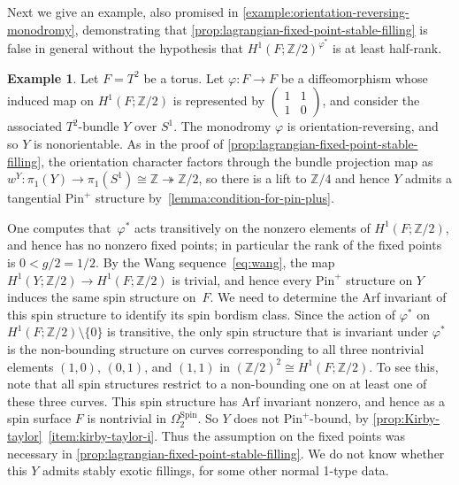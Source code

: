 \documentclass[a4paper, reqno]{amsart}
\theoremstyle{definition}
\newtheorem{example}[proposition]{Example}
\theoremstyle{remark}
\newcommand{\Z}{\mathbb{Z}}
\newcommand{\pinplus}{{\mathrm{Pin}^+}\!}
\newcommand{\Spin}{\mathrm{Spin}}
\newcommand{\sm}{\setminus}
\begin{document}
Next  we  give an example, also promised in \cref{example:orientation-reversing-monodromy}, demonstrating that   \cref{prop:lagrangian-fixed-point-stable-filling} is false in general without the hypothesis that $H^1(F;\Z/2)^{\varphi^*}$ is at least half-rank. 

\begin{example}\label{example:need-lagrangian-assumption}
 Let $F=T^2$ be a torus. Let $\varphi \colon F \to F$ be a diffeomorphism whose induced map on $H^1(F;\Z/2)$ is represented by $\left(\begin{smallmatrix}
     1 & 1 \\ 1 & 0 
 \end{smallmatrix} \right)$, and consider the associated $T^2$-bundle $Y$ over $S^1$.  
 The monodromy $\varphi$ is orientation-reversing, and so $Y$ is nonorientable.
As in the proof of \cref{prop:lagrangian-fixed-point-stable-filling}, the orientation character factors through the bundle projection map as
    $w^Y \colon \pi_1(Y) \to \pi_1(S^1) \cong \Z \twoheadrightarrow \Z/2$, so there is a lift to $\Z/4$ and hence $Y$ admits a tangential $\pinplus$ structure by~\cref{lemma:condition-for-pin-plus}. 
 
 One computes that~$\varphi^*$ acts transitively on the nonzero elements of $H^1(F;\Z/2)$, and hence has no nonzero fixed points; in particular the rank of the fixed points is $0 < g/2 = 1/2$. By the Wang sequence~\eqref{eq:wang}, the map $H^1(Y;\Z/2) \to H^1(F;\Z/2)$ is trivial, and hence every $\pinplus$ structure on $Y$ induces the same spin structure on~$F$. We need to determine the Arf invariant of this spin structure to identify its spin bordism class.  
 Since the action of $\varphi^*$ on  $H^1(F;\Z/2) \sm \{0\}$ is transitive, the only spin structure that is invariant under $\varphi^*$ is the non-bounding structure on curves corresponding to all three nontrivial elements $(1,0)$, $(0,1)$, and $(1,1)$ in $(\Z/2)^2 \cong H^1(F;\Z/2)$. To see this, note that all spin structures restrict to a non-bounding one on at least one of these three curves.
This spin structure has Arf invariant nonzero, and hence as a spin surface $F$ is nontrivial in $\Omega_2^{\Spin}$. So $Y$ does not $\pinplus$-bound, by \cref{prop:Kirby-taylor}~\eqref{item:kirby-taylor-i}. Thus the assumption on the fixed points was necessary in \cref{prop:lagrangian-fixed-point-stable-filling}.   We do not know whether this $Y$ admits stably exotic fillings, for some other normal 1-type data. 
\end{example}
\end{document}
